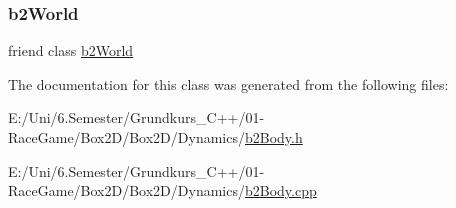 \subsubsection{\texorpdfstring{b2World}{b2World}}
{\footnotesize\ttfamily friend class \mbox{\hyperlink{classb2_world}{b2\+World}}\hspace{0.3cm}{\ttfamily [friend]}}



The documentation for this class was generated from the following files\+:\begin{DoxyCompactItemize}
\item 
E\+:/\+Uni/6.\+Semester/\+Grundkurs\+\_\+\+C++/01-\/\+Race\+Game/\+Box2\+D/\+Box2\+D/\+Dynamics/\mbox{\hyperlink{b2_body_8h}{b2\+Body.\+h}}\item 
E\+:/\+Uni/6.\+Semester/\+Grundkurs\+\_\+\+C++/01-\/\+Race\+Game/\+Box2\+D/\+Box2\+D/\+Dynamics/\mbox{\hyperlink{b2_body_8cpp}{b2\+Body.\+cpp}}\end{DoxyCompactItemize}

